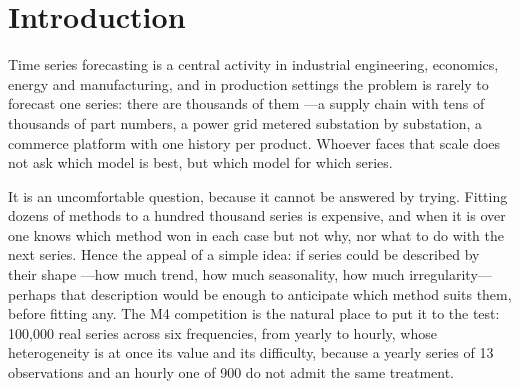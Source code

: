 \begin{abstract}
Faced with a collection, however, there are two decisions and not one: which method to
assign to each series, and how many to combine. Measured on the same data with a
\emph{bootstrap} that resamples series, both gains are significant and of comparable size
---combining $+0.0267$ with interval $[+0.0143,\ +0.0393]$, stratifying $+0.0214$ with
$[+0.0110,\ +0.0328]$--- while their difference is not. The feature-based literature
attends almost exclusively to the first, and what governs the second is not the structure
of the series but the quality spread of the bank: with evenly matched candidates,
combining wins; once N-BEATS \cite{oreshkin2020} enters the bank the conclusion reverses
in every frequency where that model dominates, under a single mechanism ---averaging
cancels biases among comparable components and drags down the best one when one of them
dominates. The contribution of the index is greatest when selecting ($+0.0215$) and
dilutes as models are combined, until it is no longer distinguishable from zero beyond
three: structural characterization turns out to be useful where the policy chooses, and
not at the ensemble sizes that perform best. A more modest result than the premise
promised, and the one the data support.

\vspace{2mm}\noindent
\textbf{Keywords:} time series; M4 competition; structural features; forecast
combination; model selection; principal component analysis; clustering; OWA;
reproducibility.
\end{abstract}


\section{Introduction}

Time series forecasting is a central activity in industrial engineering, economics, energy
and manufacturing, and in production settings the problem is rarely to forecast one
series: there are thousands of them ---a supply chain with tens of thousands of part
numbers, a power grid metered substation by substation, a commerce platform with one
history per product. Whoever faces that scale does not ask which model is best, but which
model for which series.

It is an uncomfortable question, because it cannot be answered by trying. Fitting dozens
of methods to a hundred thousand series is expensive, and when it is over one knows which
method won in each case but not why, nor what to do with the next series. Hence the appeal
of a simple idea: if series could be described by their shape ---how much trend, how much
seasonality, how much irregularity--- perhaps that description would be enough to
anticipate which method suits them, before fitting any. The M4 competition
\cite{makridakis2020} is the natural place to put it to the test: 100{,}000 real series
across six frequencies, from yearly to hourly, whose heterogeneity is at once its value
and its difficulty, because a yearly series of 13 observations and an hourly one of 900 do
not admit the same treatment.

